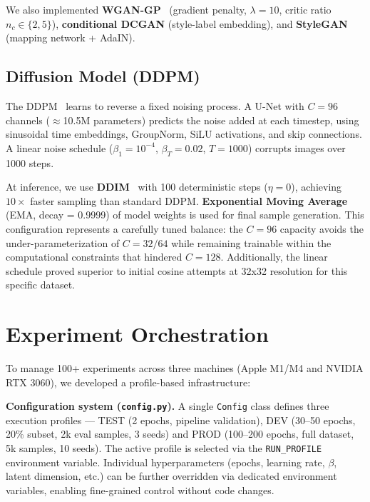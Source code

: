 \documentclass[runningheads]{llncs}
\begin{document}
We also implemented \textbf{WGAN-GP}~\cite{gulrajani2017} (gradient penalty, $\lambda=10$, critic ratio $n_c \in \{2, 5\}$), \textbf{conditional DCGAN} (style-label embedding), and \textbf{StyleGAN}~\cite{karras2018} (mapping network + AdaIN).

\subsection{Diffusion Model (DDPM)}

The DDPM~\cite{ho2020} learns to reverse a fixed noising process. A U-Net with $C=96$ channels ($\approx$10.5M parameters) predicts the noise added at each timestep, using sinusoidal time embeddings, GroupNorm, SiLU activations, and skip connections. A linear noise schedule ($\beta_1=10^{-4}$, $\beta_T=0.02$, $T=1000$) corrupts images over 1000 steps.

At inference, we use \textbf{DDIM}~\cite{song2020} with 100 deterministic steps ($\eta = 0$), achieving $10\times$ faster sampling than standard DDPM. \textbf{Exponential Moving Average} (EMA, decay = 0.9999) of model weights is used for final sample generation. This configuration represents a carefully tuned balance: the $C=96$ capacity avoids the under-parameterization of $C=32/64$ while remaining trainable within the computational constraints that hindered $C=128$. Additionally, the linear schedule proved superior to initial cosine attempts at 32x32 resolution for this specific dataset.

\section{Experiment Orchestration}\label{sec:engineering}

To manage 100+ experiments across three machines (Apple M1/M4 and NVIDIA RTX 3060), we developed a profile-based infrastructure:

\textbf{Configuration system (\texttt{config.py}).} A single \texttt{Config} class defines three execution profiles --- TEST (2 epochs, pipeline validation), DEV (30--50 epochs, 20\% subset, 2k eval samples, 3 seeds) and PROD (100--200 epochs, full dataset, 5k samples, 10 seeds). The active profile is selected via the \texttt{RUN\_PROFILE} environment variable. Individual hyperparameters (epochs, learning rate, $\beta$, latent dimension, etc.) can be further overridden via dedicated environment variables, enabling fine-grained control without code changes.
\end{document}
